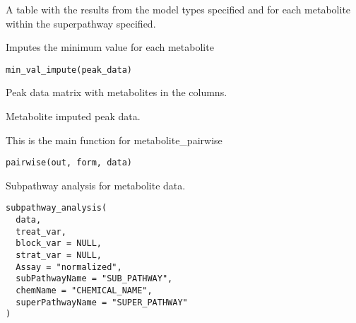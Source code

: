 \documentclass[a4paper]{book}
\begin{document}
%
\begin{Value}
A table with the results from the model types specified and for each
metabolite within the superpathway specified.
\end{Value}
%
\begin{Description}
Imputes the minimum value for each metabolite
\end{Description}
%
\begin{Usage}
\begin{verbatim}
min_val_impute(peak_data)
\end{verbatim}
\end{Usage}
%
\begin{Arguments}
\begin{ldescription}
\item[\code{peak\_data}] Peak data matrix with metabolites in the columns.
\end{ldescription}
\end{Arguments}
%
\begin{Value}
Metabolite imputed peak data.
\end{Value}
%
\begin{Description}
This is the main function for metabolite\_pairwise
\end{Description}
%
\begin{Usage}
\begin{verbatim}
pairwise(out, form, data)
\end{verbatim}
\end{Usage}
%
\begin{Description}
Subpathway analysis for metabolite data.
\end{Description}
%
\begin{Usage}
\begin{verbatim}
subpathway_analysis(
  data,
  treat_var,
  block_var = NULL,
  strat_var = NULL,
  Assay = "normalized",
  subPathwayName = "SUB_PATHWAY",
  chemName = "CHEMICAL_NAME",
  superPathwayName = "SUPER_PATHWAY"
)
\end{verbatim}
\end{Usage}
%
\end{document}
